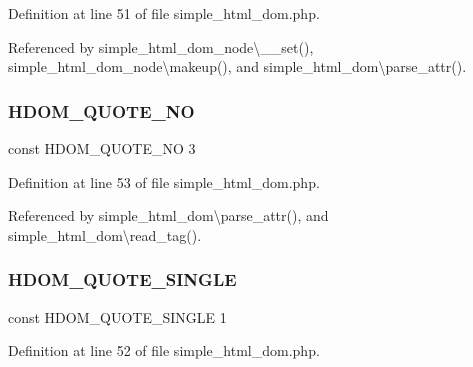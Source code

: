 Definition at line 51 of file simple\+\_\+html\+\_\+dom.\+php.



Referenced by simple\+\_\+html\+\_\+dom\+\_\+node\textbackslash{}\+\_\+\+\_\+set(), simple\+\_\+html\+\_\+dom\+\_\+node\textbackslash{}makeup(), and simple\+\_\+html\+\_\+dom\textbackslash{}parse\+\_\+attr().

\hypertarget{simple__html__dom_8php_a80e228a23e5559489d524efbeaf418ea}{}\label{simple__html__dom_8php_a80e228a23e5559489d524efbeaf418ea} 
\subsubsection{\texorpdfstring{H\+D\+O\+M\+\_\+\+Q\+U\+O\+T\+E\+\_\+\+NO}{HDOM\_QUOTE\_NO}}
{\footnotesize\ttfamily const H\+D\+O\+M\+\_\+\+Q\+U\+O\+T\+E\+\_\+\+NO 3}



Definition at line 53 of file simple\+\_\+html\+\_\+dom.\+php.



Referenced by simple\+\_\+html\+\_\+dom\textbackslash{}parse\+\_\+attr(), and simple\+\_\+html\+\_\+dom\textbackslash{}read\+\_\+tag().

\hypertarget{simple__html__dom_8php_ac662929a9b7fc153be9f5e6b7030f848}{}\label{simple__html__dom_8php_ac662929a9b7fc153be9f5e6b7030f848} 
\subsubsection{\texorpdfstring{H\+D\+O\+M\+\_\+\+Q\+U\+O\+T\+E\+\_\+\+S\+I\+N\+G\+LE}{HDOM\_QUOTE\_SINGLE}}
{\footnotesize\ttfamily const H\+D\+O\+M\+\_\+\+Q\+U\+O\+T\+E\+\_\+\+S\+I\+N\+G\+LE 1}



Definition at line 52 of file simple\+\_\+html\+\_\+dom.\+php.



